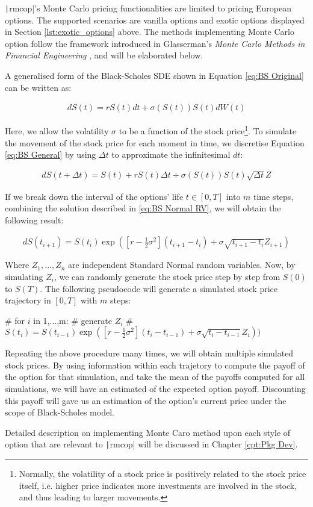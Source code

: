 \texttt|rmcop|'s Monte Carlo pricing functionalities are limited to pricing European options. The supported scenarios are vanilla options and exotic options displayed in Section \ref{lst:exotic_options} above. The methods implementing Monte Carlo option follow the framework introduced in Glasserman's \textit{Monte Carlo Methods in Financial Engineering} \cite{Glasserman2003}, and will be elaborated below.

A generalised form of the Black-Scholes SDE shown in Equation \ref{eq:BS Original} can be written as:

\begin{align} \label{eq:BS General}
dS(t) = rS(t)dt + \sigma(S(t))S(t)dW(t)
\end{align}

Here, we allow the volatility $\sigma$ to be a function of the stock price\footnote{Normally, the volatility of a stock price is positively related to the stock price itself, i.e. higher price indicates more investments are involved in the stock, and thus leading to larger movements.}. To simulate the movement of the stock price for each moment in time, we discretise Equation \ref{eq:BS General} by using $\Delta t$ to approximate the infinitesimal $dt$:

\begin{align}
dS(t + \Delta t) = S(t) + rS(t)\Delta t + \sigma(S(t))S(t)\sqrt{\Delta t}Z
\end{align}

If we break down the interval of the options' life $t\in[0,T]$ into $m$ time steps, combining the solution described in \ref{eq:BS Normal RV}, we will obtain the following result:

\begin{align} \label{eq:BS for MC}
dS(t_{i+1}) = S(t_i)\exp{([r - \frac{1}{2}\sigma^2](t_{i+1}-t_i) + \sigma\sqrt{t_{i+1} - t_i}Z_{i+1})}
\end{align}

Where $Z_1,...,Z_n$ are independent Standard Normal random variables. Now, by simulating $Z_i$, we can randomly generate the stock price step by step from $S(0)$ to $S(T)$. The following pseudocode will generate a simulated stock price trajectory in $[0,T]$ with $m$ steps:

\begin{Rminted}
# for $i$ in 1,...,m:
#	generate $Z_{i}$
#	$S(t_i) = S(t_{i-1})\exp{([r - \frac{1}{2}\sigma^2](t_{i}-t_{i-1}) + \sigma\sqrt{t_{i}-t_{i-1}}Z_{i}))}$
\end{Rminted}

Repeating the above procedure many times, we will obtain multiple simulated stock prices. By using information within each trajetory to compute the payoff of the option for that simulation, and take the mean of the payoffs computed for all simulations, we will have an estimated of the expected option payoff. Discounting this payoff will gave us an estimation of the option's current price under the scope of Black-Scholes model.

Detailed description on implementing Monte Caro method upon each style of option that are relevant to \texttt|rmcop| will be discussed in Chapter \ref{cpt:Pkg Dev}.

\newpage